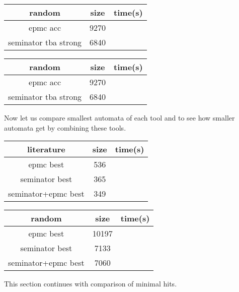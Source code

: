 \documentclass[
	digital
nolof, nolot
]{fithesis3}
\newcommand{\hlineny}{\hline}
\begin{document}
{	\begin{center}
		\begin{tabular}{ |c|c|c| } 
			\hline
			random&size&time(s)\\
			\hline
			epmc acc&9270 & \\
			\hline
			seminator tba strong &6840 & \\
			\hlineny
		\end{tabular}
	\end{center}
	\begin{center}
		\begin{tabular}{ |c|c|c| } 
			\hline
			random&size&time(s)\\
			\hline
			epmc acc&9270 & \\
			\hline
			seminator tba strong &6840 & \\
			\hlineny
		\end{tabular}
	\end{center}
		Now let us compare smallest automata of each tool and to see how smaller automata get by combining these tools.
		\begin{center}
			\begin{tabular}{ |c|c|c| } 
				\hline
				literature&size&time(s)\\
				\hline
				epmc best&536 & \\
				\hline
				seminator best &365 & \\
				\hlineny
				seminator+epmc best &349 & \\ 
				\hlineny
			\end{tabular}
		\end{center}
	\begin{center}
		\begin{tabular}{ |c|c|c| } 
			\hline
			random&size&time(s)\\
			\hline
			epmc best&10197 & \\
			\hline
			seminator best &7133 & \\
			\hlineny
			seminator+epmc best &7060 & \\ 
			\hlineny
		\end{tabular}
	\end{center}

This section continues with comparison of minimal hits.

}
\end{document}

